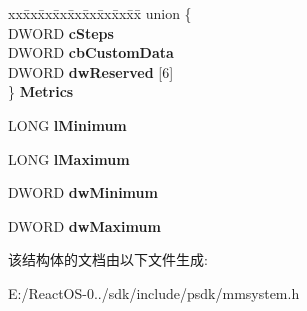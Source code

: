 \begin{DoxyCompactItemize}
\begin{tabbing}
\end{tabbing}\item 
\mbox{\label{structtag_m_i_x_e_r_c_o_n_t_r_o_l_w_aff65782ddd4c46e4e72dadd8d7dba782}} 
\begin{tabbing}
xx\=xx\=xx\=xx\=xx\=xx\=xx\=xx\=xx\=\kill
union \{\\
\>DWORD {\bfseries cSteps}\\
\>DWORD {\bfseries cbCustomData}\\
\>DWORD {\bfseries dwReserved} \mbox{[}6\mbox{]}\\
\} {\bfseries Metrics}\\

\end{tabbing}\item 
\mbox{\label{structtag_m_i_x_e_r_c_o_n_t_r_o_l_w_ab22db0155cd5ad69a9134472acb0c7b8}} 
L\+O\+NG {\bfseries l\+Minimum}
\item 
\mbox{\label{structtag_m_i_x_e_r_c_o_n_t_r_o_l_w_af73b495905737dd8387f575795edf415}} 
L\+O\+NG {\bfseries l\+Maximum}
\item 
\mbox{\label{structtag_m_i_x_e_r_c_o_n_t_r_o_l_w_a708f6d14679df5bfd7ecee5d2c135df4}} 
D\+W\+O\+RD {\bfseries dw\+Minimum}
\item 
\mbox{\label{structtag_m_i_x_e_r_c_o_n_t_r_o_l_w_a762ac6b9e02f6f891208bff5410e66ef}} 
D\+W\+O\+RD {\bfseries dw\+Maximum}
\end{DoxyCompactItemize}


该结构体的文档由以下文件生成\+:\begin{DoxyCompactItemize}
\item 
E\+:/\+React\+O\+S-\/0../sdk/include/psdk/mmsystem.\+h\end{DoxyCompactItemize}
